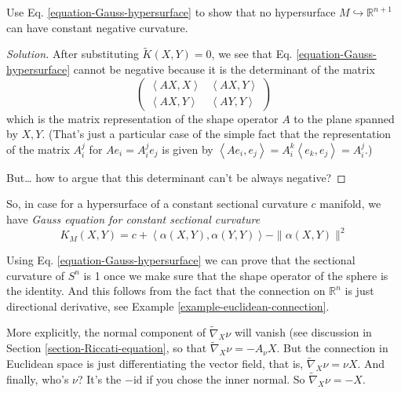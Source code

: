 \begin{exercise}
\label{exercise-Gauss-sectional}
Use Eq. \ref{equation-Gauss-hypersurface} to show that no 
hypersurface $M \hookrightarrow \mathbb{R}^{n+1}$ can have constant negative 
curvature.
\end{exercise}

\begin{proof}[Solution]
After substituting $\tilde{K}(X,Y)=0$, we see that Eq. 
\ref{equation-Gauss-hypersurface} cannot be negative because it is the
determinant of the matrix
$$
\begin{pmatrix}
\left<AX,X\right>&\left<AX,Y\right>\\ 
\left<AX,Y\right>&\left<AY,Y\right>
\end{pmatrix}
$$
which is the matrix representation of the shape operator $A$ to the plane
spanned by $X,Y$. (That's just a particular case of the simple fact that the
representation of the matrix $A_i^j$ for $Ae_i=A_i^je_j$ is given by
$\left<Ae_i,e_j\right>=A^k_i\left<e_k,e_j\right>=A^j_i$.)

But… how to argue that this determinant can't be always negative?
\end{proof}

So, in case for a hypersurface of a constant sectional curvature $c$ manifold,
we have {\it Gauss equation for constant sectional curvature}
\begin{equation}
\label{equation-Gauss-constant-sectional-curvature}
K_M(X,Y)=c+\left<\alpha(X,Y),\alpha(Y,Y)\right>-\|\alpha(X,Y)\|^2
\end{equation}

\begin{example}
\label{example-curvature-of-sphere}
Using Eq. \ref{equation-Gauss-hypersurface} we can prove that the sectional
curvature of $S^n$ is 1 once we make sure that the shape operator of the sphere
is the identity. And this follows from the fact that the connection on
$\mathbb{R}^n$ is just directional derivative, see Example 
\ref{example-euclidean-connection}.

More explicitly, the normal component of $\tilde{\nabla}_X\nu$ will vanish (see
discussion in Section \ref{section-Riccati-equation}, so that
$\tilde{\nabla}_X\nu=-A_\nu X$. But the connection in Euclidean space is just
differentiating the vector field, that is, $\tilde{\nabla}_X\nu=\nu X$. And
finally, who's $\nu$? It's the $-\text{id}$ if you chose the inner normal. So
 $\tilde{\nabla}_X\nu=-X$.
\end{example}

